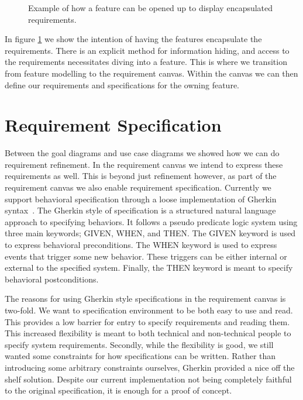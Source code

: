 \begin{figure}
	\centering
	
	\caption{Example of how a feature can be opened up to display encapsulated requirements.}
	\label{fig:feature-requirement}
\end{figure}

In figure \ref{fig:feature-requirement} we show the intention of having the features encapsulate the requirements. There is an explicit method for information hiding, and access to the requirements necessitates diving into a feature. This is where we transition from feature modelling to the requirement canvas. Within the canvas we can then define our requirements and specifications for the owning feature. 

\section{Requirement Specification}

Between the goal diagrams and use case diagrams we showed how we can do requirement refinement. In the requirement canvas we intend to express these requirements as well. This is beyond just refinement however, as part of the requirement canvas we also enable requirement specification. Currently we support behavioral specification through a loose implementation of Gherkin syntax~\cite{cucumberdocs}. The Gherkin style of specification is a structured natural language approach to specifying behaviors. It follows a pseudo predicate logic system using three main keywords; GIVEN, WHEN, and THEN. The GIVEN keyword is used to express behavioral preconditions. The WHEN keyword is used to express events that trigger some new behavior. These triggers can be either internal or external to the specified system. Finally, the THEN keyword is meant to specify behavioral postconditions. 

The reasons for using Gherkin style specifications in the requirement canvas is two-fold. We want to specification environment to be both easy to use and read. This provides a low barrier for entry to specify requirements and reading them. This increased flexibility is meant to both technical and non-technical people to specify system requirements. Secondly, while the flexibility is good, we still wanted some constraints for how specifications can be written. Rather than introducing some arbitrary constraints ourselves, Gherkin provided a nice off the shelf solution. Despite our current implementation not being completely faithful to the original specification, it is enough for a proof of concept.

